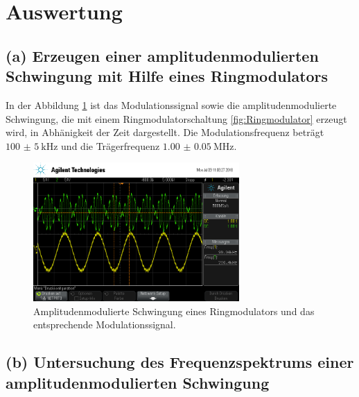 \newpage
\section{Auswertung}
\label{sec:Auswertung}


\subsection{(a) Erzeugen einer amplitudenmodulierten Schwingung mit
Hilfe eines Ringmodulators}
\label{subsec:auswertung_a}
In der Abbildung \ref{fig:ringamp_zeit} ist das Modulationssignal
sowie die amplitudenmodulierte Schwingung, die mit einem Ringmodulatorschaltung \ref{fig:Ringmodulator}
erzeugt wird,
in Abhänigkeit der Zeit dargestellt.
Die Modulationsfrequenz beträgt $\SI{100(5)}{\kilo\hertz}$
und die Trägerfrequenz $\SI{1.00(5)}{\mega\hertz}$.

\begin{figure}
  \centering
  \includegraphics[width=0.7\textwidth]{osci/amp_ringmodulator.png}
  \caption{Amplitudenmodulierte
  Schwingung eines Ringmodulators und das entsprechende Modulationssignal.}
  \label{fig:ringamp_zeit}
\end{figure}

\FloatBarrier
\subsection{(b) Untersuchung des Frequenzspektrums einer
amplitudenmodulierten Schwingung}
\label{subsec:auswertung_b}

